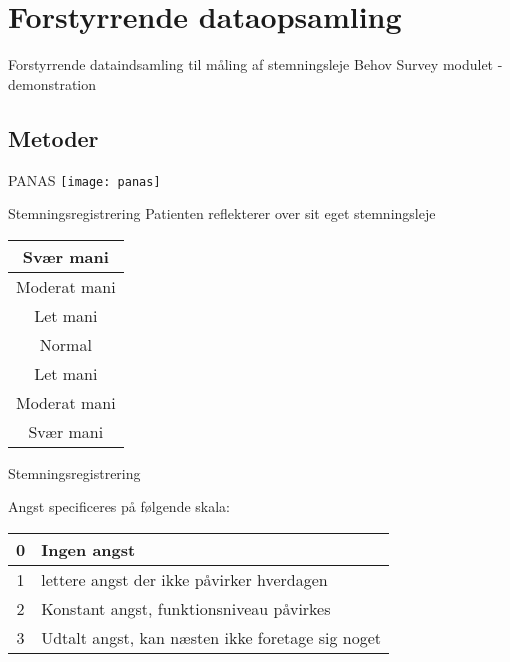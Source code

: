 \section{Forstyrrende dataopsamling}
{\aauwavesbg%
\begin{frame} %
Forstyrrende dataindsamling
	 til måling af stemningsleje
	Behov
	Survey modulet - demonstration	
\end{frame}}
	
\subsection{Metoder}

{\aauwavesbg%
\begin{frame}{PANAS} %
\texttt{[image: panas]}
	
\end{frame}}

{\aauwavesbg%
	\begin{frame}{Stemningsregistrering} %
		Patienten reflekterer over sit eget stemningsleje
		
		\begin{center}
		\begin{tabular}{|c|}
			\hline \cellcolor{red} Svær mani \\ 
			\hline \cellcolor{red!60} Moderat mani \\ 
			\hline \cellcolor{red!20} Let mani \\ 
			\hline \cellcolor{yellow} Normal \\ 
			\hline \cellcolor{blue!20} Let mani \\ 
			\hline \cellcolor{blue!60} Moderat mani \\ 
			\hline \cellcolor{blue} Svær mani \\ 
			\hline 
		\end{tabular} 
		\end{center}
	\end{frame}}
	
{\aauwavesbg%
	\begin{frame}{Stemningsregistrering} %

		Angst specificeres på følgende skala:
		\begin{tabular}{| c | l|}
			\hline 0 & Ingen angst \\ 
			\hline 1 & lettere angst der ikke påvirker hverdagen\\ 
			\hline 2 & Konstant angst, funktionsniveau påvirkes\\ 
			\hline 3 & Udtalt angst, kan næsten ikke foretage sig noget\\
			\hline
		\end{tabular} 
	\end{frame}}
	
